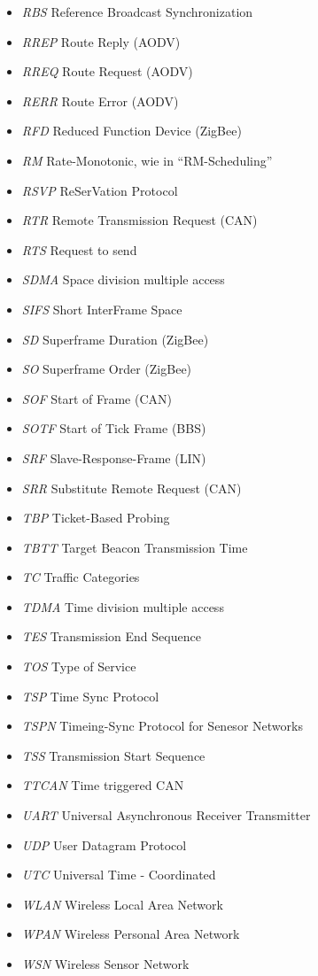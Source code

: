 \documentclass{article}
\begin{document}
\begin{itemize}
	\item \emph{RBS} Reference Broadcast Synchronization
	\item \emph{RREP} Route Reply (AODV)
	\item \emph{RREQ} Route Request (AODV)
	\item \emph{RERR} Route Error (AODV)
	\item \emph{RFD} Reduced Function Device (ZigBee)
	\item \emph{RM} Rate-Monotonic, wie in "`RM-Scheduling"'
	\item \emph{RSVP} ReSerVation Protocol
	\item \emph{RTR} Remote Transmission Request (CAN)
	\item \emph{RTS} Request to send
	\item \emph{SDMA} Space division multiple access
	\item \emph{SIFS} Short InterFrame Space
	\item \emph{SD} Superframe Duration (ZigBee)
	\item \emph{SO} Superframe Order (ZigBee)
	\item \emph{SOF} Start of Frame (CAN)
	\item \emph{SOTF} Start of Tick Frame (BBS)
	\item \emph{SRF} Slave-Response-Frame (LIN)
	\item \emph{SRR} Substitute Remote Request (CAN)
	\item \emph{TBP} Ticket-Based Probing
	\item \emph{TBTT} Target Beacon Transmission Time
	\item \emph{TC} Traffic Categories
	\item \emph{TDMA} Time division multiple access
	\item \emph{TES} Transmission End Sequence
	\item \emph{TOS} Type of Service
	\item \emph{TSP} Time Sync Protocol
	\item \emph{TSPN} Timeing-Sync Protocol for Senesor Networks
	\item \emph{TSS} Transmission Start Sequence
	\item \emph{TTCAN} Time triggered CAN
	\item \emph{UART} Universal Asynchronous Receiver Transmitter
	\item \emph{UDP} User Datagram Protocol
	\item \emph{UTC} Universal Time - Coordinated
	\item \emph{WLAN} Wireless Local Area Network
	\item \emph{WPAN} Wireless Personal Area Network
	\item \emph{WSN} Wireless Sensor Network
\end{itemize}
\end{document}
